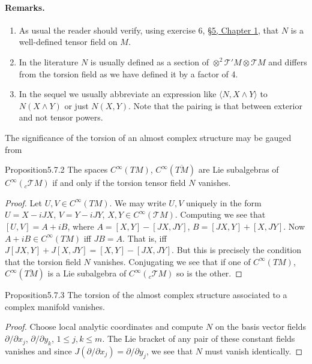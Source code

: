 \paragraph{Remarks.}
\begin{enumerate}
\item As usual the reader should verify, using exercise 6, \hyperref[sec:1:5]{\S5, Chapter 1}, that $N$ is a well-defined tensor field on $M$.
\item In the literature $N$ is usually defined as a section of $\otimes^2\mathcal T'M\otimes\mathcal TM$ and differs from the torsion field as we have defined it by a factor of 4.
\item In the sequel we usually abbreviate an expression like $\langle N,X\wedge Y\rangle$ to $N(X\wedge Y)$ or just $N(X,Y)$. Note that the pairing is that between exterior and not tensor powers.
\end{enumerate}
The significance of the torsion of an almost complex structure may be gauged from
\begin{originaltheorem}{Proposition}{5.7.2}
The spaces $C^\infty(TM)$, $C^\infty(\overline{TM})$ are Lie subalgebras of $C^\infty({}_c\mathcal TM)$ if and only if the torsion tensor field $N$ vanishes.
\end{originaltheorem}
\begin{proof}
Let $U,V\in C^\infty(TM)$. We may write $U,V$ uniquely in the form $U=X-iJX$, $V=Y-iJY$, $X,Y\in C^\infty(\mathcal TM)$. Computing we see that $[U,V]=A+iB$, where $A=[X,Y]-[JX,JY]$, $B=[JX,Y]+[X,JY]$. Now $A+iB\in C^\infty(TM)$ iff $JB=A$. That is, iff $J[JX,Y]+J[X,JY]=[X,Y]-[JX,JY]$. But this is precisely the condition that the torsion field $N$ vanishes. Conjugating we see that if one of $C^\infty(TM)$, $C^\infty(\overline{TM})$ is a Lie subalgebra of $C^\infty({}_c\mathcal TM)$ so is the other.
\end{proof}
\begin{originaltheorem}{Proposition}{5.7.3}
The torsion of the almost complex structure associated to a complex manifold vanishes.
\end{originaltheorem}
\begin{proof}
Choose local analytic coordinates and compute $N$ on the basis vector fields $\partial/\partial x_j$, $\partial/\partial y_k$, $1\leq j,k\leq m$. The Lie bracket of any pair of these constant fields vanishes and since $J(\partial/\partial x_j)=\partial/\partial y_j$, we see that $N$ must vanish identically.
\end{proof}
